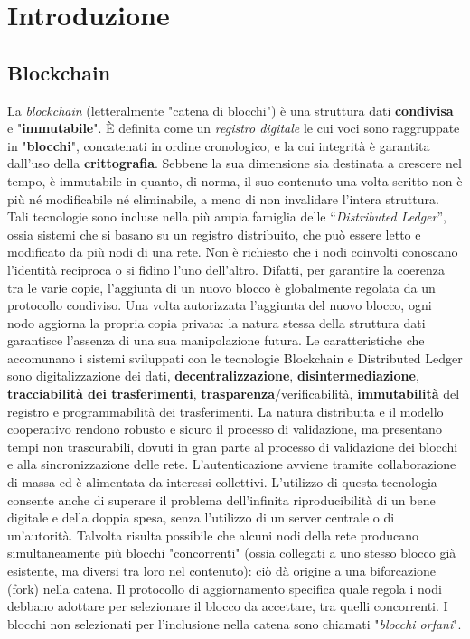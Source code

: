 \section{Introduzione}

\subsection{Blockchain}

La \textit{blockchain} (letteralmente "catena di blocchi") è una struttura dati
\textbf{condivisa} e "\textbf{immutabile}". È definita come un \textit{registro
    digitale} le cui voci sono raggruppate in "\textbf{blocchi}", concatenati in
ordine cronologico, e la cui integrità è garantita dall'uso della
\textbf{crittografia}. Sebbene la sua dimensione sia destinata a crescere nel
tempo, è immutabile in quanto, di norma, il suo contenuto una volta scritto non
è più né modificabile né eliminabile, a meno di non invalidare l'intera
struttura. Tali tecnologie sono incluse nella più ampia famiglia delle
“\textit{Distributed Ledger}”, ossia sistemi che si basano su un registro
distribuito, che può essere letto e modificato da più nodi di una rete. Non è
richiesto che i nodi coinvolti conoscano l'identità reciproca o si fidino l'uno
dell'altro. Difatti, per garantire la coerenza tra le varie copie, l'aggiunta di
un nuovo blocco è globalmente regolata da un protocollo condiviso. Una volta
autorizzata l'aggiunta del nuovo blocco, ogni nodo aggiorna la propria copia
privata: la natura stessa della struttura dati garantisce l'assenza di una sua
manipolazione futura. Le caratteristiche che accomunano i sistemi sviluppati con
le tecnologie Blockchain e Distributed Ledger sono digitalizzazione dei dati,
\textbf{decentralizzazione}, \textbf{disintermediazione}, \textbf{tracciabilità
    dei trasferimenti}, \textbf{trasparenza}/verificabilità, \textbf{immutabilità}
del registro e programmabilità dei trasferimenti. La natura distribuita e il
modello cooperativo rendono robusto e sicuro il processo di validazione, ma
presentano tempi non trascurabili, dovuti in gran parte al processo di
validazione dei blocchi e alla sincronizzazione delle rete. L'autenticazione
avviene tramite collaborazione di massa ed è alimentata da interessi collettivi.
L'utilizzo di questa tecnologia consente anche di superare il problema
dell'infinita riproducibilità di un bene digitale e della doppia spesa, senza
l'utilizzo di un server centrale o di un'autorità. Talvolta risulta possibile
che alcuni nodi della rete producano simultaneamente più blocchi "concorrenti"
(ossia collegati a uno stesso blocco già esistente, ma diversi tra loro nel
contenuto): ciò dà origine a una biforcazione (fork) nella catena. Il protocollo
di aggiornamento specifica quale regola i nodi debbano adottare per selezionare
il blocco da accettare, tra quelli concorrenti. I blocchi non selezionati per
l'inclusione nella catena sono chiamati "\textit{blocchi orfani}".

